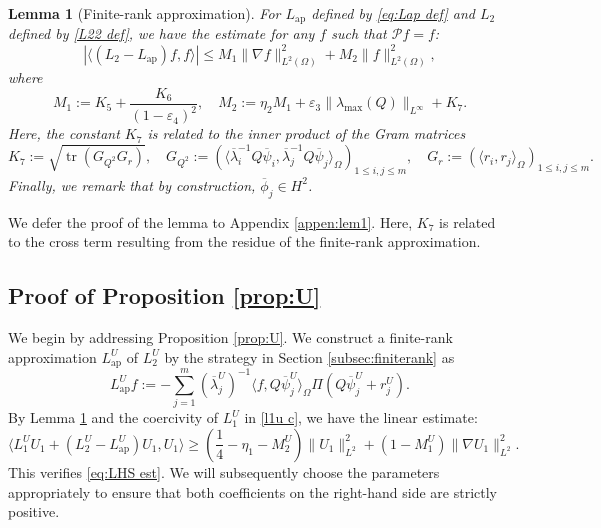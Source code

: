 \documentclass[11pt,a4paper]{article}
\numberwithin{equation}{section}
\newcommand{\assign}{:=}
\newcommand{\tmop}[1]{\ensuremath{\operatorname{#1}}}
\newtheorem{lemma}{Lemma}
\begin{document}
\begin{lemma}[Finite-rank approximation]
  \label{lem:fe est}For $L_{\tmop{ap}}$ defined by \eqref{eq:Lap def}
  and $L_2$ defined by \eqref{L22 def},
    we have the estimate for any $f$ such that $\mathcal{P} f=f$:
  \[  |\langle (L_2 - L_{\tmop{ap}}) f, f \rangle |\leqslant M_1 \|
     \nabla f \|_{L^2(\Omega)}^2 + M_2 \| f \|_{L^2(\Omega)}^2, \]
  where
  \[ M_1\assign K_5+\frac{K_6}{(1-\varepsilon_4)^2},\quad M_2 \assign \eta_2M_1+\varepsilon_3\| \lambda_{\max} (Q) \|_{L^\infty}+K_7. \]
    Here, the constant $K_7$ is related to the inner product of the Gram matrices %
    \begin{equation}K_7\assign\sqrt{\tmop{tr}(G_{Q^2}G_r)},\quad
G_{Q^2}\assign(\langle \overline{\lambda}_i^{-1}Q\overline\psi_i, \overline{\lambda}_j^{-1}Q\overline\psi_j \rangle_{ \Omega})_{1\leqslant i, j\leqslant m},\quad  G_r\assign(\langle r_i, r_j \rangle_{ \Omega})_{1\leqslant i, j\leqslant m} .
      \label{eq:qusi-or1}
  \end{equation} 
  Finally, we remark that by construction, $\overline\phi_j \in H^2$.
\end{lemma}
We defer the proof of the lemma to Appendix \ref{appen:lem1}. Here, $K_7$ is related to the cross term resulting from the residue of the finite-rank approximation.

\subsection{Proof of Proposition \ref{prop:U}}\label{Sec:prop 3}

We begin by addressing Proposition \ref{prop:U}.  We construct a finite-rank
approximation $L_{\tmop{ap}}^{U}$ of $L_2^U$ by the strategy in Section \ref{subsec:finiterank} as
\begin{equation}
  L_{\tmop{ap}}^{U} f \assign -\sum_{j = 1}^m (\overline{\lambda}_j^U)^{-1} \langle f, Q\overline\psi^U_j \rangle_{
  \Omega} \Pi (Q \overline\psi^U_j + r_j^U)  . \label{eq:Lapu def}
\end{equation}
By Lemma \ref{lem:fe est} and the coercivity of $L_1^U$ in \eqref{l1u c}, we have the  linear estimate:
\begin{equation}
  \langle L_1^U U_1 + (L_2^U - L_{\tmop{ap}}^{U}) U_1,
  U_1 \rangle \geqslant ( \frac{1}{4} - \eta_1 - M_2^U ) \| U_1
  \|_{L^2}^2 + (1 - M_1^U) \| \nabla U_1 \|_{L^2}^2 . \label{eq:TU lin est}
\end{equation}
This verifies \eqref{eq:LHS est}. We will subsequently choose the parameters
appropriately to ensure that both coefficients on the right-hand side are
strictly positive.
\end{document}
